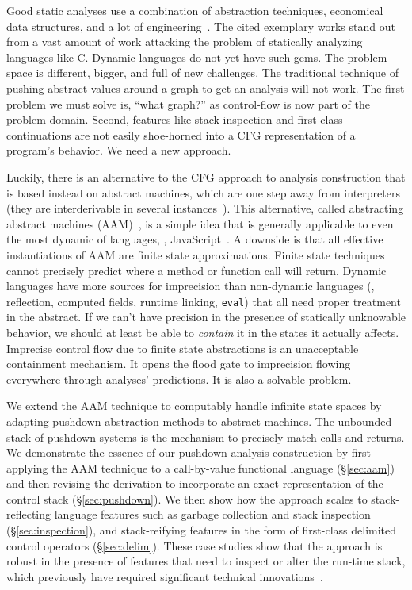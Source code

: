 Good static analyses use a combination of abstraction techniques, economical data structures, and a lot of engineering~\citep{ianjohnson:CousotEtAl-TASE07,ianjohnson:DBLP:journals/ipl/YiCKK07}.
%
The cited exemplary works stand out from a vast amount of work attacking the problem of statically analyzing languages like C.
%
Dynamic languages do not yet have such gems.
%
The problem space is different, bigger, and full of new challenges.
%
The traditional technique of pushing abstract values around a graph to get an analysis will not work.
%
The first problem we must solve is, ``what graph?'' as control-flow is now part of the problem domain.
%
Second, features like stack inspection and first-class continuations are not easily shoe-horned into a CFG representation of a program's behavior.
%
We need a new approach. %

%
Luckily, there is an alternative to the CFG approach to analysis construction that is based instead on abstract machines, which are one step away from interpreters (they are interderivable in several instances~\citep{ianjohnson:DBLP:conf/icfp/Danvy08}).
%
This alternative, called abstracting abstract machines
(AAM)~\citep{dvanhorn:VanHorn2012Systematic}, is a simple
idea that is generally applicable to even the most dynamic of
languages, \eg{},
JavaScript~\citep{ianjohnson:DBLP:journals/corr/KashyapDKWGSWH14}.
%
A downside is that all effective instantiations of AAM are finite state approximations.
%
Finite state techniques cannot precisely predict where a method or function call will return.
%
Dynamic languages have more sources for imprecision than non-dynamic languages (\eg{}, reflection, computed fields, runtime linking, {\tt eval}) that all need proper treatment in the abstract.
%
If we can't have precision in the presence of statically unknowable behavior, we should at least be able to \emph{contain} it in the states it actually affects.
%
Imprecise control flow due to finite state abstractions is an unacceptable containment mechanism.
%
It opens the flood gate to imprecision flowing everywhere through analyses' predictions.
%
It is also a solvable problem.
%

%
We extend the AAM technique to computably handle infinite state spaces by adapting pushdown abstraction methods to abstract machines.
%
The unbounded stack of pushdown systems is the mechanism to precisely match calls and returns.
%
We demonstrate the essence of our pushdown analysis construction by
first applying the AAM technique to a call-by-value functional
language (\S\ref{sec:aam}) and then revising the derivation to
incorporate an exact representation of the control stack
(\S\ref{sec:pushdown}).  We then show how the approach scales to
stack-reflecting language features such as garbage collection and
stack inspection (\S\ref{sec:inspection}), and stack-reifying features
in the form of first-class delimited control operators (\S\ref{sec:delim}).
%
These case studies show that the approach is robust in the presence of
features that need to inspect or alter the run-time stack, which
previously have required significant technical
innovations~\cite{ianjohnson:Vardoulakis2011Pushdown,ianjohnson:DBLP:journals/jfp/JohnsonSEMH14}.

